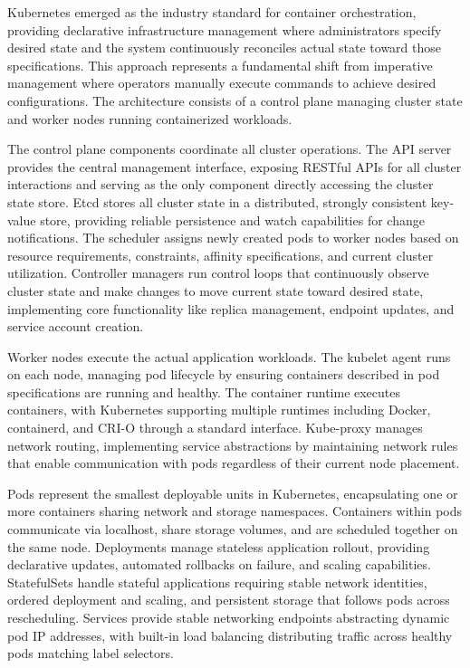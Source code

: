 \documentclass[a4paper, 12pt]{report}
\begin{document}
Kubernetes emerged as the industry standard for container orchestration, providing declarative infrastructure management where administrators specify desired state and the system continuously reconciles actual state toward those specifications. This approach represents a fundamental shift from imperative management where operators manually execute commands to achieve desired configurations. The architecture consists of a control plane managing cluster state and worker nodes running containerized workloads.

The control plane components coordinate all cluster operations. The API server provides the central management interface, exposing RESTful APIs for all cluster interactions and serving as the only component directly accessing the cluster state store. Etcd stores all cluster state in a distributed, strongly consistent key-value store, providing reliable persistence and watch capabilities for change notifications. The scheduler assigns newly created pods to worker nodes based on resource requirements, constraints, affinity specifications, and current cluster utilization. Controller managers run control loops that continuously observe cluster state and make changes to move current state toward desired state, implementing core functionality like replica management, endpoint updates, and service account creation.

Worker nodes execute the actual application workloads. The kubelet agent runs on each node, managing pod lifecycle by ensuring containers described in pod specifications are running and healthy. The container runtime executes containers, with Kubernetes supporting multiple runtimes including Docker, containerd, and CRI-O through a standard interface. Kube-proxy manages network routing, implementing service abstractions by maintaining network rules that enable communication with pods regardless of their current node placement.

Pods represent the smallest deployable units in Kubernetes, encapsulating one or more containers sharing network and storage namespaces. Containers within pods communicate via localhost, share storage volumes, and are scheduled together on the same node. Deployments manage stateless application rollout, providing declarative updates, automated rollbacks on failure, and scaling capabilities. StatefulSets handle stateful applications requiring stable network identities, ordered deployment and scaling, and persistent storage that follows pods across rescheduling. Services provide stable networking endpoints abstracting dynamic pod IP addresses, with built-in load balancing distributing traffic across healthy pods matching label selectors.
\end{document}

